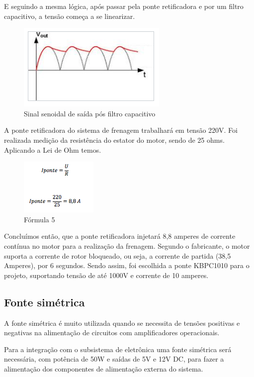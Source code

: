 E seguindo a mesma lógica, após passar pela ponte retificadora e por um filtro capacitivo,  a tensão começa a se linearizar.

\begin{figure}[!h]
	\centering
		\includegraphics[scale=0.5]{figuras/energia/11.png}
	\caption{Sinal senoidal de saída pós filtro capacitivo}
\end{figure}

A ponte retificadora do sistema de frenagem trabalhará em tensão 220V. Foi realizada medição da resistência do estator do motor, sendo de 25 ohms. Aplicando a Lei de Ohm temos.

\begin{figure}[!h]
	\centering
		\includegraphics[scale=0.9]{figuras/energia/12.png}
	\caption{Fórmula 5}
\end{figure}

Concluímos então, que a ponte retificadora injetará 8,8 amperes de corrente contínua no motor para a realização da frenagem. Segundo o fabricante, o motor suporta a corrente de rotor bloqueado, ou seja, a corrente de partida (38,5 Amperes), por 6 segundos. Sendo assim, foi escolhida a ponte KBPC1010 para o projeto, suportando tensão de até 1000V e corrente de 10 amperes.

\subsection{Fonte simétrica}
A fonte simétrica é muito utilizada  quando se necessita de tensões positivas e negativas na alimentação de circuitos com amplificadores operacionais. 

Para a integração com o subsistema de eletrônica uma fonte simétrica será necessária, com potência de 50W e saídas de 5V e 12V DC, para fazer a alimentação dos componentes de alimentação externa do sistema.

